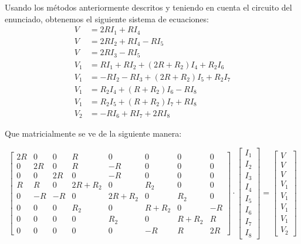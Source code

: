 \documentclass[letter, 11pt]{article}
\begin{document}
Usando los métodos anteriormente descritos y teniendo en cuenta el circuito del enunciado, obtenemos el siguiente sistema de ecuaciones:
\begin{equation*}
\begin{align}
  V&=2RI_1+RI_4\\
  V&=2RI_2+RI_4-RI_5\\
  V&=2RI_3-RI_5\\
  V_1&=RI_1+RI_2+(2R+R_2)I_4+R_2I_6\\
  V_1&=-RI_2-RI_3+(2R+R_2)I_5+R_2I_7\\
  V_1&=R_2I_4+(R+R_2)I_6-RI_8\\
  V_1&=R_2I_5+(R+R_2)I_7+RI_8\\
  V_2&=-RI_6+RI_7+2RI_8
\end{align}
\end{equation*}


Que matricialmente se ve de la siguiente manera:

\begin{equation*}
\begin{bmatrix}
2R & 0  & 0  & R      &   0        &   0       &   0       &   0 \\
0  & 2R & 0  & R      &   -R       &   0       &   0       &   0 \\
0  & 0  & 2R & 0      &   -R       &   0       &   0       &   0 \\
R  & R  & 0  & 2R+R_2 &   0        &   R_2     &   0       &   0 \\
0  & -R & -R & 0      &   2R+R_2   &   0       &   R_2     &   0 \\
0  & 0  & 0  & R_2    &   0        &   R+R_2   &   0       &   -R \\
0  & 0  & 0  & 0      &   R_2      &   0       &   R+R_2   &   R \\
0  & 0  & 0  & 0      &   0        &   -R      &   R       &   2R
\end{bmatrix}
\cdot
\begin{bmatrix}
I_1\\
I_2\\
I_3\\
I_4\\
I_5\\
I_6\\
I_7\\
I_8
\end{bmatrix}
=
\begin{bmatrix}
V\\
V\\
V\\
V_1\\
V_1\\
V_1\\
V_1\\
V_2
\end{bmatrix}
\end{equation*}
\end{document}
